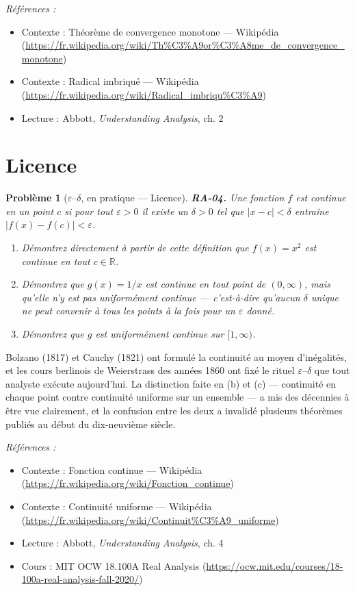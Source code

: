 \documentclass[11pt]{article}
\newtheorem{problem}{Problème}
\newenvironment{refs}{\par\small\noindent\emph{Références :}\begin{itemize}\setlength\itemsep{0pt}}{\end{itemize}\normalsize}
\begin{document}
\begin{refs}
\item Contexte : Théorème de convergence monotone --- Wikipédia (\url{https://fr.wikipedia.org/wiki/Th%C3%A9or%C3%A8me_de_convergence_monotone})
\item Contexte : Radical imbriqué --- Wikipédia (\url{https://fr.wikipedia.org/wiki/Radical_imbriqu%C3%A9})
\item Lecture : Abbott, \textit{Understanding Analysis}, ch. 2
\end{refs}

\bigskip


\section*{Licence}

\begin{problem}[{$\varepsilon$--$\delta$, en pratique --- Licence}]
\textbf{RA-04.} Une fonction $ f $ est continue en un point $ c $ si
pour tout $ \varepsilon > 0 $ il existe un $ \delta > 0 $ tel que
$ |x - c| < \delta $ entraîne $ |f(x) - f(c)| < \varepsilon $.
\begin{enumerate}
\item[(a)] Démontrez directement à partir de cette définition que $ f(x) = x^2 $ est continue en tout
$ c \in \mathbb{R} $.
\item[(b)] Démontrez que $ g(x) = 1/x $ est continue en tout point de
$ (0, \infty) $, mais qu'elle n'y est \textit{pas uniformément} continue --- c'est-à-dire qu'aucun
$ \delta $ unique ne peut convenir à tous les points à la fois pour un $ \varepsilon $ donné.
\item[(c)] Démontrez que
$ g $ \textit{est} uniformément continue sur $ [1, \infty) $.
\end{enumerate}

\end{problem}

\noindent Bolzano (1817) et Cauchy (1821) ont formulé la continuité au moyen d'inégalités,
et les cours berlinois de Weierstrass des années 1860 ont fixé le rituel $\varepsilon$--$\delta$ que tout analyste
exécute aujourd'hui. La distinction faite en (b) et (c) --- continuité en chaque point contre
continuité uniforme sur un ensemble --- a mis des décennies à être vue clairement, et la confusion
entre les deux a invalidé plusieurs \og{} théorèmes \fg{} publiés au début du dix-neuvième siècle.

\begin{refs}
\item Contexte : Fonction continue --- Wikipédia (\url{https://fr.wikipedia.org/wiki/Fonction_continue})
\item Contexte : Continuité uniforme --- Wikipédia (\url{https://fr.wikipedia.org/wiki/Continuit%C3%A9_uniforme})
\item Lecture : Abbott, \textit{Understanding Analysis}, ch. 4
\item Cours : MIT OCW 18.100A Real Analysis (\url{https://ocw.mit.edu/courses/18-100a-real-analysis-fall-2020/})
\end{refs}
\end{document}
